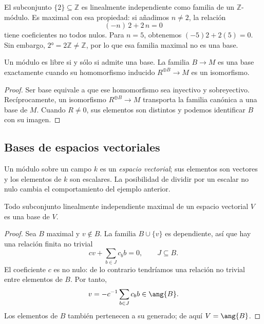 \begin{ejem}
El subconjunto $\{2\}\subseteq\mathbb Z$ es linealmente independiente como familia de un $\mathbb Z$-módulo. Es maximal con esa propiedad: si añadimos $n\ne2$, la relación
\[
(-n)\,2+2\,n=0
\]
tiene coeficientes no todos nulos. Para $n=5$, obtenemos $(-5)2+2(5)=0$. Sin embargo, $\ang{2}=2\mathbb Z\ne\mathbb Z$, por lo que esa familia maximal no es una base.
\end{ejem}

\begin{lema}\label{lema:C20-libre-base}
Un módulo es libre si y sólo si admite una base. La familia $B\to M$ es una base exactamente cuando su homomorfismo inducido $R^{\oplus B}\to M$ es un isomorfismo.
\end{lema}
\begin{proof}
Ser base equivale a que ese homomorfismo sea inyectivo y sobreyectivo. Recíprocamente, un isomorfismo $R^{\oplus B}\to M$ transporta la familia canónica a una base de $M$. Cuando $R\ne0$, sus elementos son distintos y podemos identificar $B$ con su imagen.
\end{proof}

\subsection{Bases de espacios vectoriales}\label{tema:20-1-2}
Un módulo sobre un campo $k$ es un \emph{espacio vectorial}; sus elementos son vectores y los elementos de $k$ son escalares. La posibilidad de dividir por un escalar no nulo cambia el comportamiento del ejemplo anterior.

\begin{lema}\label{lema:C20-maximal-base}
Todo subconjunto linealmente independiente maximal de un espacio vectorial $V$ es una base de $V$.
\end{lema}
\begin{proof}
Sea $B$ maximal y $v\notin B$. La familia $B\cup\{v\}$ es dependiente, así que hay una relación finita no trivial
\[
cv+\sum_{b\in J}c_bb=0,\qquad J\subseteq B.
\]
El coeficiente $c$ es no nulo: de lo contrario tendríamos una relación no trivial entre elementos de $B$. Por tanto,
\[
v=-c^{-1}\sum_{b\in J}c_bb\in\ang{B}.
\]
Los elementos de $B$ también pertenecen a su generado; de aquí $V=\ang{B}$.
\end{proof}

